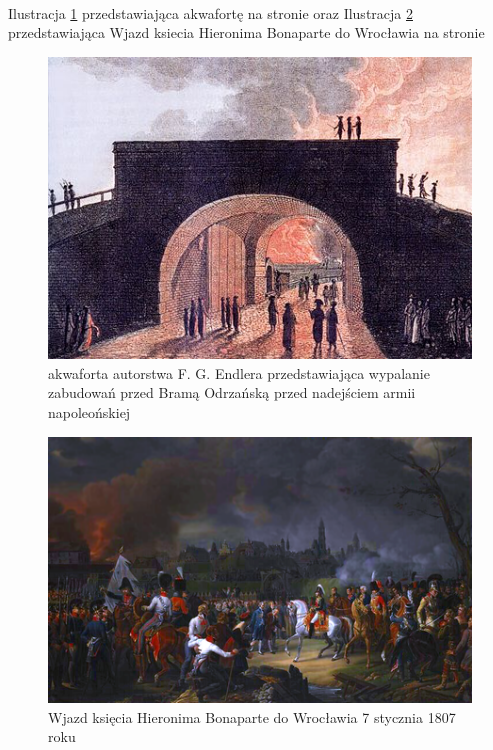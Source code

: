 \documentclass{article}
\begin{document}
\\
Ilustracja \ref{fig:akwaforta} przedstawiająca akwafortę na stronie \pageref{fig:akwaforta} oraz Ilustracja \ref{fig:wjazd} przedstawiająca Wjazd  ksiecia Hieronima Bonaparte  do  Wrocławia na stronie \pageref{fig:wjazd}
\begin{figure}[h!]
\centering
\includegraphics[scale=4]{450px-Firestorm-Breslau1806.jpg}
\caption{akwaforta autorstwa F. G. Endlera przedstawiająca wypalanie zabudowań przed Bramą Odrzańską przed nadejściem armii napoleońskiej}
\label{fig:akwaforta}
\end{figure}

\begin{figure}[h!]
\centering
\includegraphics[scale=1.3]{450px-Entrée_du_Prince_Jérôme_à_Breslau_le_7_janvier_1807.png}
\caption{Wjazd księcia Hieronima Bonaparte do Wrocławia 7 stycznia 1807 roku}
\label{fig:wjazd}
\end{figure}
\end{document}
